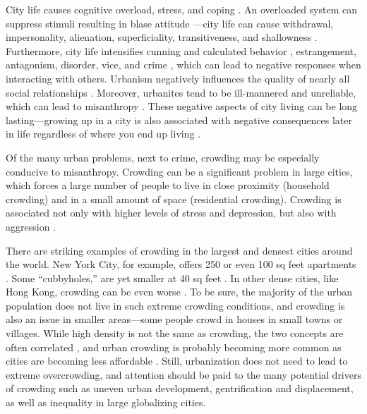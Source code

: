 \documentclass[11pt, letterpaper]{article}
\begin{document}
\begin{spacing}{1.4}
City life causes cognitive overload, stress, and coping \citep{simmel03, milgram70,lederbogen11}. An overloaded system can suppress stimuli resulting in blase attitude
\citep{simmel03}---city life can cause withdrawal, impersonality, alienation, superficiality, transitiveness, and shallowness \citep{wirth38}. Furthermore, city life intensifies cunning and calculated behavior \citep{tonnies57}, estrangement, antagonism, disorder, vice, and crime
\citep{milgram70,park15,park84,bettencourt10b}, which can lead to negative 
responses when interacting with others.
%
Urbanism negatively influences the quality of nearly all social relationships
\citep{wilson85}. Moreover, urbanites tend to be ill-mannered and unreliable,
which can lead to misanthropy
\citep[e.g.,][]{aokCityBook15,aok-sizeFetish17}. These negative aspects of city living can be long lasting---growing up in a city is also associated with negative consequences later in life regardless of where you end up living \citep{lederbogen11,aok20}.

%
Of the many urban problems, next to crime, crowding may be especially conducive to
misanthropy.  
Crowding can be a significant problem in large cities, which forces a large number of people to live in close proximity (household crowding) and in a small amount of space (residential crowding). Crowding is associated not only with higher levels of stress and depression, but also with aggression \citep{regoeczi2008,calhoun62}. 

There are striking examples of crowding in the largest and densest cities around
the world. New York City, for example, offers 250 or even 100 sq feet apartments
\citep{abc,yoneda,dailynews}. Some ``cubbyholes,'' are yet smaller at 40 sq feet \citep{newyorktimes}. In other dense cities, like Hong Kong, crowding can be even worse \citep{newyorktimes2}. To
  be sure, the majority of the urban population does not live in such extreme crowding conditions, and crowding is also an issue in smaller areas---some people crowd in houses in small towns or villages.
  While high density is not the same as crowding, the two concepts are often
  correlated \citep{meyer13}, and urban crowding is probably becoming more
  common  as cities are becoming less affordable  \citep[e.g.,][]{misraCL15oct6,floridaCL18apr11,weinbergCL16aug11,solariMISC19apr24,schuetzMISC19may7,kotkin_db_mar20_13}. 
%    
 Still, urbanization does not need to lead to extreme overcrowding, and attention should be
 paid to the many potential drivers of crowding such as  uneven urban
  development, gentrification and displacement, as well as inequality in large
  globalizing cities. 


\end{spacing}
\end{document}
